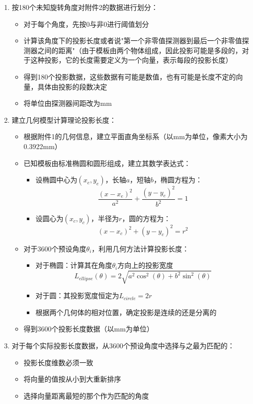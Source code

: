 \begin{enumerate}
    \item 按180个未知旋转角度对附件2的数据进行划分：
    \begin{itemize}
        \item 对于每个角度，先按0与非0进行阈值划分
        \item 计算该角度下的投影长度或者说"第一个非零值探测器到最后一个非零值探测器之间的距离"（由于模板由两个物体组成，因此投影可能是多段的，对于这种投影，它的长度需要定义为一个向量，表示每段的投影长度）
        \item 得到180个投影数据，这些数据有可能是数值，也有可能是长度不定的向量，具体由投影的段数决定
        \item 将单位由探测器间距改为mm
    \end{itemize}

    \item 建立几何模型计算理论投影长度：
    \begin{itemize}
        \item 根据附件1的几何信息，建立平面直角坐标系（以mm为单位，像素大小为0.3922mm）
        \item 已知模板由标准椭圆和圆形组成，建立其数学表达式：
        \begin{itemize}
            \item 设椭圆中心为$(x_e, y_e)$，长轴$a$，短轴$b$，椭圆方程为：
            $$\frac{(x-x_e)^2}{a^2} + \frac{(y-y_e)^2}{b^2} = 1$$
            \item 设圆心为$(x_c, y_c)$，半径为$r$，圆的方程为：
            $$(x-x_c)^2 + (y-y_c)^2 = r^2$$
        \end{itemize}
        \item 对于3600个预设角度$\theta_i$，利用几何方法计算投影长度：
        \begin{itemize}
            \item 对于椭圆：计算其在角度$\theta_i$方向上的投影宽度
            $$L_{ellipse}(\theta) = 2\sqrt{a^2\cos^2(\theta) + b^2\sin^2(\theta)}$$
            \item 对于圆：其投影宽度恒定为$L_{circle} = 2r$
            \item 根据两个几何体的相对位置，确定投影是连续的还是分离的
        \end{itemize}
        \item 得到3600个投影长度数据（以mm为单位）
    \end{itemize}

    \item 对于每个实际投影长度数据，从3600个预设角度中选择与之最为匹配的：
    \begin{itemize}
        \item 投影长度维数必须一致
        \item 将向量的值按从小到大重新排序
        \item 选择向量距离最短的那个作为匹配的角度
    \end{itemize}
\end{enumerate}

